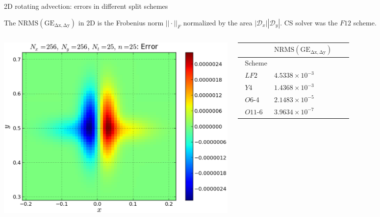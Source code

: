 \documentclass{beamer}
\begin{document}
\begin{frame}{2D rotating advection: errors in different split schemes}

The $\mathrm{NRMS(GE_{\Delta x, \Delta y})}$ in 2D is the Frobenius norm $||\cdot ||_F$ normalized by the area $|\mathcal{D}_x||\mathcal{D}_y|$.
CS solver was the $F12$ scheme.

\begin{columns}
\hspace*{-5mm}\includegraphics[scale = 0.35]{graphics/Error_closeup8}
\hspace*{4mm}\begin{tabular}{@{}llll@{}}\toprule
& $\mathrm{NRMS(GE_{\Delta x, \Delta y})}$ \\ \midrule
$\phantom{a}$Scheme\\
$\phantom{a}LF2$ & $4.5338\times 10^{-3}$ \\
$\phantom{a}Y4$ & $1.4368\times 10^{-3}$ \\
$\phantom{a}O6$-4 & $2.1483\times 10^{-5}$ \\
$\phantom{a}O11$-6 & $3.9634\times 10^{-7}$ \\
\bottomrule
\end{tabular}
\end{columns}

\end{frame}
\end{document}
